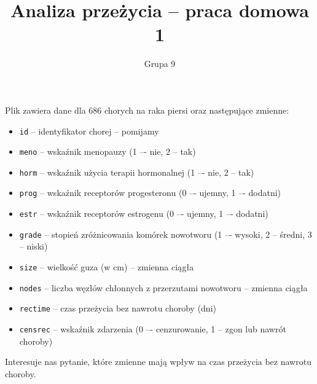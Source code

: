 \documentclass[10pt]{article}
\begin{document}
\author{Grupa 9}
\title{Analiza przeżycia -- praca domowa 1}
\maketitle

Plik zawiera dane dla 686 chorych na raka piersi oraz następujące zmienne:
\begin{itemize}
\item \texttt{id} -- identyfikator chorej -- pomijamy
\item \texttt{meno} -- wskaźnik menopauzy (1 –- nie, 2 -- tak) 
\item \texttt{horm} -- wskaźnik użycia terapii hormonalnej (1 –- nie, 2 -- tak) 
\item \texttt{prog} -- wskaźnik receptorów progesteronu (0 –- ujemny, 1 –- dodatni) 
\item \texttt{estr} -- wskaźnik receptorów estrogenu (0 –- ujemny, 1 –- dodatni) 
\item \texttt{grade} -- stopień zróżnicowania komórek nowotworu (1 –- wysoki, 2 -- średni, 3 -- niski) 
\item \texttt{size} -- wielkość guza (w cm) -- zmienna ciągła
\item \texttt{nodes} -- liczba węzłów chłonnych z przerzutami nowotworu -- zmienna ciągła
\item \texttt{rectime} -- czas przeżycia bez nawrotu choroby (dni) 
\item \texttt{censrec} -- wskaźnik zdarzenia (0 –- cenzurowanie, 1 -- zgon lub nawrót choroby)
\end{itemize}

Interesuje nas pytanie, które zmienne mają wpływ na czas przeżycia bez nawrotu choroby. \\\\
\end{document}
